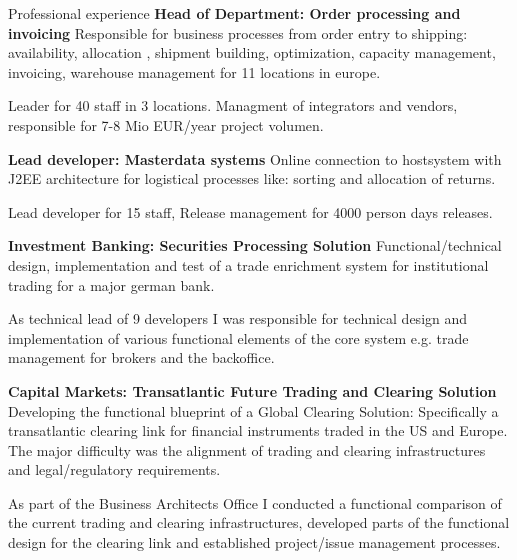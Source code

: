 \begin{rubric}{Professional experience}
\entry*[08/2006 - 07/2009] \textbf{Head of Department: Order processing and invoicing}\newline
{} 
Responsible for business processes from order entry to shipping: availability, allocation , shipment building, optimization, capacity management, invoicing, warehouse management for 11 locations in europe.\axelvspace

Leader for 40 staff in 3 locations. Managment of integrators and vendors, responsible for 7-8 Mio EUR/year project volumen.

\entry*[01/2005 - 07/2006] \textbf{Lead developer: Masterdata systems}\newline
{} 
Online connection to hostsystem with J2EE architecture for logistical processes like: sorting and allocation of returns.\axelvspace

Lead developer for 15 staff, Release management for 4000 person days releases.

\entry*[10/2003 - 12/2004] \textbf{Investment Banking: Securities Processing Solution}\newline
{} 
Functional/technical design, implementation and test of a trade enrichment system for institutional trading for a major german bank.\axelvspace

As technical lead of 9 developers I was responsible for technical design and implementation of various functional elements of the core system e.g. trade management for brokers and the backoffice. 

\entry*[07/2003 - 10/2003] \textbf{Capital Markets: Transatlantic Future Trading and Clearing Solution}\newline
{} 
Developing the functional blueprint of a Global Clearing Solution: Specifically a transatlantic clearing link for financial instruments traded in the US and Europe. The major difficulty was the alignment of trading and clearing infrastructures and legal/regulatory requirements.

As part of the Business Architects Office I conducted a functional comparison of the current trading and clearing infrastructures, developed parts of the functional design for the clearing link and established project/issue management processes.


\end{rubric}
